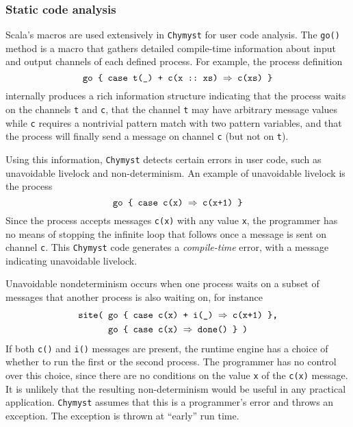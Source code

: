 \documentclass[sigplan,10pt,review,anonymous]{acmart}\settopmatter{printfolios=true}
\begin{document}
\subsubsection{Static code analysis}

Scala's macros are used extensively in \texttt{Chymyst} for user code
analysis. The \texttt{go()} method is a macro that gathers detailed
compile-time information about input and output channels of each defined
process. For example, the process definition
\[
\text{\texttt{go \{ case t(\_) + c(x ::~xs) \ensuremath{\Rightarrow} c(xs) \}}}
\]
internally produces a rich information structure indicating that the
process waits on the channels \texttt{t} and \texttt{c}, that the
channel \texttt{t} may have arbitrary message values while \texttt{c}
requires a nontrivial pattern match with two pattern variables, and
that the process will finally send a message on channel \texttt{c}
(but not on \texttt{t}).

Using this information, \texttt{Chymyst} detects certain errors in
user code, such as unavoidable livelock and non-determinism. An example
of unavoidable livelock is the process
\[
\text{\texttt{go \{ case c(x) \ensuremath{\Rightarrow} c(x+1) \}}}
\]
Since the process accepts messages \texttt{c(x)} with any value \texttt{x},
the programmer has no means of stopping the infinite loop that follows
once a message is sent on channel \texttt{c}. This \texttt{Chymyst}
code generates a \emph{compile-time} error, with a message indicating
unavoidable livelock.

\begin{comment}
Deadlocks can only happen when using synchronous channels and are
harder to detect reliably. A deadlock warning is given when the process
sends a synchronous message followed by another message that is consumed
together with the synchronous one:
\[
\text{\texttt{go \{ case a(\_) + c(x) + f(\_, r) \ensuremath{\Rightarrow} c(f() + 1); r(x) \}}}
\]
This code is suspicious because the process waits for a reply to \texttt{f()}
and \emph{then} sends \texttt{c()}, while a reply to \texttt{f()}
happens only \emph{after} both \texttt{f()} and \texttt{c()} are sent.
\end{comment}

Unavoidable nondeterminism occurs when one process waits on a subset
of messages that another process is also waiting on, for instance
\begin{align*}
\text{\texttt{site( }} & \text{\texttt{go \{ case c(x) + i(\_) \ensuremath{\Rightarrow} c(x+1) \},}}\\
 & \text{\text{\texttt{go \{ case c(x) }}\texttt{\ensuremath{\Rightarrow} done() \} )}}
\end{align*}
If both \texttt{c()} and \texttt{i()} messages are present, the runtime
engine has a choice of whether to run the first or the second process.
The programmer has no control over this choice, since there are no
conditions on the value \texttt{x} of the \texttt{c(x)} message. It
is unlikely that the resulting non-determinism would be useful in
any practical application. \texttt{Chymyst} assumes that this is a
programmer's error and throws an exception. The exception is thrown
at ``early'' run time.
\end{document}
